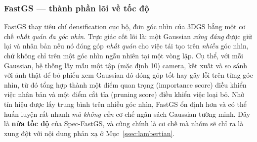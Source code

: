         \subsubsection{FastGS — thành phần lõi về tốc độ}
        FastGS \cite{fastgs} thay tiêu chí densification cục bộ, đơn góc nhìn của
        3DGS bằng một cơ chế \textit{nhất quán đa góc nhìn}. Trực giác cốt lõi là:
        một Gaussian \textit{xứng đáng} được giữ lại và nhân bản nếu nó đóng góp
        \textit{nhất quán} cho việc tái tạo trên \textit{nhiều} góc nhìn, chứ không
        chỉ trên một góc nhìn ngẫu nhiên tại một vòng lặp. Cụ thể, với mỗi Gaussian,
        hệ thống lấy mẫu một tập (mặc định 10) camera, kết xuất và so sánh với ảnh
        thật để bỏ phiếu xem Gaussian đó đóng góp tốt hay gây lỗi trên từng góc
        nhìn, từ đó tổng hợp thành một điểm quan trọng (importance score) điều khiển
        việc nhân bản và một điểm cắt tỉa (pruning score) điều khiển việc loại bỏ.
        Nhờ tín hiệu được lấy trung bình trên nhiều góc nhìn, FastGS ổn định hơn và
        có thể huấn luyện rất nhanh \textit{mà không cần} cơ chế ngân sách Gaussian
        tường minh. Đây là \textbf{nửa tốc độ} của Spec-FastGS, và cũng chính là cơ
        chế mà nhóm sẽ chỉ ra là xung đột với nội dung phản xạ ở
        Mục~\ref{ssec:lambertian}.

